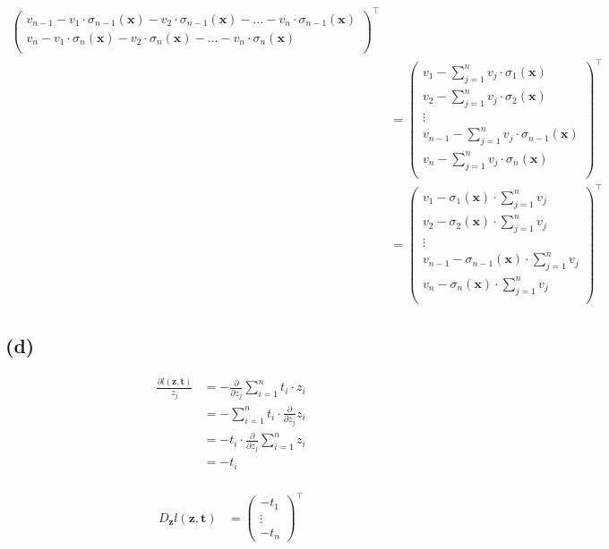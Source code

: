\begin{align*}
\begin{pmatrix}
v_{n-1} - v_1 \cdot \sigma_{n-1}(\boldsymbol{x}) - v_2 \cdot \sigma_{n-1}(\boldsymbol{x}) - \dots - v_n \cdot \sigma_{n-1}(\boldsymbol{x}) \\
v_n - v_1 \cdot \sigma_n(\boldsymbol{x}) - v_2 \cdot \sigma_n(\boldsymbol{x}) - \dots - v_n \cdot \sigma_n(\boldsymbol{x}) \\
\end{pmatrix}^\top \\
&=
\begin{pmatrix}
v_1 - \sum_{j=1}^n v_j \cdot \sigma_1(\boldsymbol{x}) \\
v_2 - \sum_{j=1}^n v_j \cdot \sigma_2(\boldsymbol{x}) \\
\vdots \\
v_{n-1} - \sum_{j=1}^n v_j \cdot \sigma_{n-1}(\boldsymbol{x}) \\
v_n - \sum_{j=1}^n v_j \cdot \sigma_n(\boldsymbol{x}) \\
\end{pmatrix}^\top \\
&=
\begin{pmatrix}
v_1 - \sigma_1(\boldsymbol{x}) \cdot \sum_{j=1}^n v_j \\
v_2 - \sigma_2(\boldsymbol{x}) \cdot \sum_{j=1}^n v_j \\
\vdots \\
v_{n-1} - \sigma_{n-1}(\boldsymbol{x}) \cdot \sum_{j=1}^n v_j \\
v_n - \sigma_n(\boldsymbol{x}) \cdot \sum_{j=1}^n v_j \\
\end{pmatrix}^\top
\end{align*}

\subsection*{(d)}
\begin{align*}
\frac{\partial l(\boldsymbol{z}, \boldsymbol{t})}{z_j} &= - \frac{\partial}{\partial z_j} \sum_{i=1}^n t_i \cdot z_i \\
&= - \sum_{i=1}^n t_i \cdot \frac{\partial}{\partial z_j} z_i \\
&= - t_i \cdot \frac{\partial}{\partial z_j} \sum_{i=1}^n z_i \\
&= - t_i \\
\end{align*}


\begin{align*}
D_{\boldsymbol{z}}l(\boldsymbol{z}, \boldsymbol{t})
&=
\begin{pmatrix}
- t_1 \\
\vdots \\
- t_n
\end{pmatrix}^\top
\end{align*}